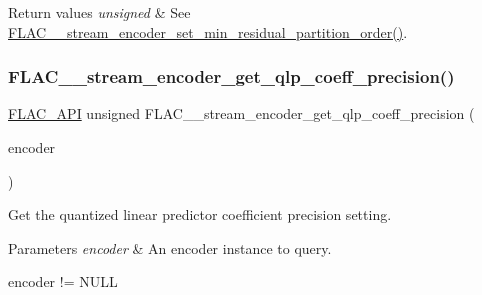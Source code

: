 \begin{DoxyRetVals}{Return values}
{\em unsigned} & See \hyperlink{group__flac__stream__encoder_gae3e2dd204f276d051bf1a118383bfda2}{F\+L\+A\+C\+\_\+\+\_\+stream\+\_\+encoder\+\_\+set\+\_\+min\+\_\+residual\+\_\+partition\+\_\+order()}. \\
\hline
\end{DoxyRetVals}
\mbox{\label{group__flac__stream__encoder_ga40ae31529071b3be2f39968d4265c663}} 
\subsubsection{\texorpdfstring{F\+L\+A\+C\+\_\+\+\_\+stream\+\_\+encoder\+\_\+get\+\_\+qlp\+\_\+coeff\+\_\+precision()}{FLAC\_\_stream\_encoder\_get\_qlp\_coeff\_precision()}}
{\footnotesize\ttfamily \hyperlink{group__flac__export_ga56ca07df8a23310707732b1c0007d6f5}{F\+L\+A\+C\+\_\+\+A\+PI} unsigned F\+L\+A\+C\+\_\+\+\_\+stream\+\_\+encoder\+\_\+get\+\_\+qlp\+\_\+coeff\+\_\+precision (\begin{DoxyParamCaption}\item[{\hyperlink{zconf_8h_a2c212835823e3c54a8ab6d95c652660e}{const} \hyperlink{struct_f_l_a_c_____stream_encoder}{F\+L\+A\+C\+\_\+\+\_\+\+Stream\+Encoder} $\ast$}]{encoder }\end{DoxyParamCaption})}

Get the quantized linear predictor coefficient precision setting.


\begin{DoxyParams}{Parameters}
{\em encoder} & An encoder instance to query.  
\begin{DoxyCode}
encoder != NULL 
\end{DoxyCode}
 \\
\hline
\end{DoxyParams}

